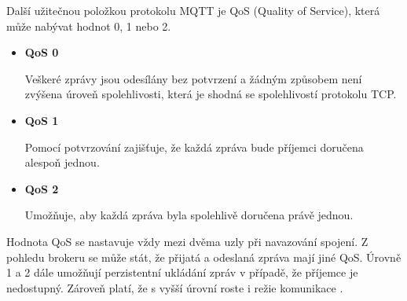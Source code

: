   Další užitečnou položkou protokolu MQTT je QoS (Quality of Service),
  která může nabývat hodnot 0, 1 nebo 2.
  
   \begin{itemize}
    \item \textbf{QoS 0}
    
    Veškeré zprávy jsou odesílány bez potvrzení a žádným způsobem
    není zvýšena úroveň spolehlivosti, která je shodná se spolehlivostí protokolu TCP.
    
    \newpage
    \item \textbf{QoS 1}
    
    Pomocí potvrzování zajišťuje, že každá zpráva bude příjemci doručena alespoň jednou.
    
    \item \textbf{QoS 2}
    
     Umožňuje, aby každá zpráva byla spolehlivě doručena právě jednou.
   \end{itemize}
  Hodnota QoS se nastavuje vždy mezi dvěma uzly při navazování spojení.
  Z pohledu brokeru se může stát, že přijatá a odeslaná zpráva mají jiné QoS.
  Úrovně 1 a 2 dále umožňují perzistentní ukládání zpráv v případě, že příjemce je
  nedostupný. Zároveň platí, že s vyšší úrovní roste i režie komunikace \cite{mqtt_intro}.

